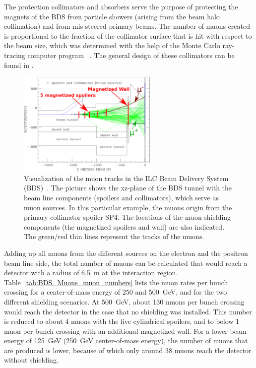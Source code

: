 The protection collimators and absorbers serve the purpose of protecting the magnets of the BDS from particle showers (arising from the beam halo collimation) and from mis-steered primary beams.
The number of muons created is proportional to the fraction of the collimator surface that is hit with respect to the beam size, which was determined with the help of the Monte Carlo ray-tracing computer program \turtle~\cite{Turtle}.
The general design of these collimators can be found in \cite{BDS_coll_design}.
\begin{figure}
\centering
\includegraphics[width=0.6\textwidth]{Figures/BDS_muons/BDS_Tunnel_Spoilers+Wall_edited.png}
\caption[Muon tracks in the Beam Delivery Systems]{Visualization of the muon tracks in the ILC Beam Delivery System (BDS)~\cite{Lewis}.
The picture shows the xz-plane of the BDS tunnel with the beam line components (spoilers and collimators), which serve as muon sources.
In this particular example, the muons origin from the primary collimator spoiler SP4.
The locations of the muon shielding components (the magnetized spoilers and wall) are also indicated.
The green/red thin lines represent the tracks of the muons.}
\label{fig:BDS_Muons:tracks}
\end{figure}
Adding up all muons from the different sources on the electron and the positron beam line side, the total number of muons can be calculated that would reach a detector with a radius of \SI{6.5}{\meter} at the interaction region.
Table~\ref{tab:BDS_Muons_muon_numbers} lists the muon rates per bunch crossing for a center-of-mass energy of 250 and \SI{500}{\GeV}, and for the two different shielding scenarios.
At \SI{500}{\GeV}, about 130 muons per bunch crossing would reach the detector in the case that no shielding was installed.
This number is reduced to about 4 muons with the five cylindrical spoilers, and to below 1 muon per bunch crossing with an additional magnetized wall.
For a lower beam energy of \SI{125}{\GeV} (\SI{250}{\GeV} center-of-mass energy), the number of muons that are produced is lower, because of which only around 38 muons reach the detector without shielding.
